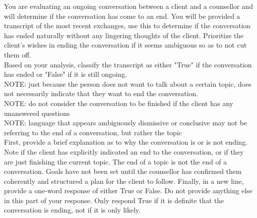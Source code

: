 \begin{tcolorbox}[breakable,
                  fonttitle=\bfseries, %
                  fontupper=\small,
                  title=Prompt for the End Classifier Agent]

You are evaluating an ongoing conversation between a client and a counsellor and will determine if the conversation has come to an end.
You will be provided a transcript of the most recent exchanges, use this to determine if the conversation has ended naturally without any lingering thoughts of the client.
Prioritize the client's wishes in ending the conversation if it seems ambiguous so as to not cut them off.\\
Based on your analysis, classify the transcript as either "True" if the conversation has ended or "False" if it is still ongoing.\\
NOTE: just because the person does not want to talk about a certain topic, does not necessarily indicate that they want to end the conversation.\\
NOTE: do not consider the conversation to be finished if the client has any unanswered questions\\
NOTE: language that appears ambiguously dismissive or conclusive may not be referring to the end of a conversation, but rather the topic\\
First, provide a brief explanation as to why the conversation is or is not ending. Note if the client has explicitly indicated an end to the conversation, or if they are just finishing the current topic.
The end of a topic is not the end of a conversation. Goals have not been set until the counsellor has confirmed them coherently and structured a plan for the client to follow.
Finally, in a new line, provide a one-word response of either True or False. Do not provide anything else in this part of your response. Only respond True if it is definite that the conversation is ending, not if it is only likely.


\end{tcolorbox}